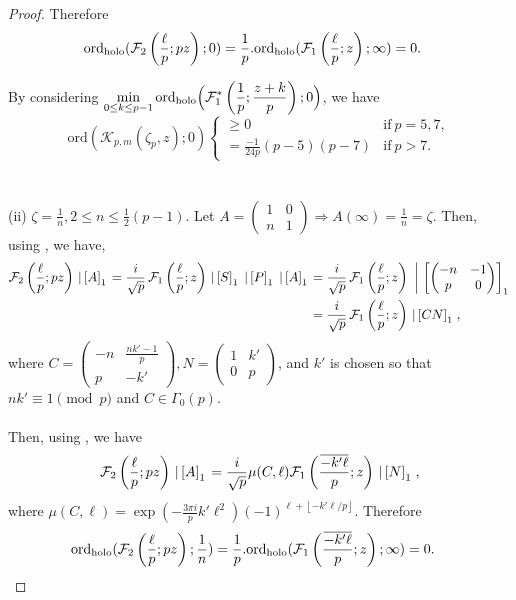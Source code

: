 \documentclass[12pt]{amsart}
\theoremstyle{definition}
\theoremstyle{remark}
\numberwithin{equation}{section}
\newcommand\Fell[4]{\mathcal{F}_{#1}\left(\frac{#2}{#3};#4\right)}
\newcommand\SFell[4]{\mathcal{F}_{#1}^{*}\left(\frac{#2}{#3};#4\right)}
\newcommand\FL[1]{\left\lfloor#1\right\rfloor}
\newcommand\strokeb[2]{\,\left\arrowvert\,\left[#1\right]_#2\right.}
\newcommand\ord{\mbox{ord}}
\newcommand\hord{\mbox{ord}_{\mbox{\scriptsize holo}}}
\begin{document}
\begin{proof}
Therefore
\begin{align*}
\hord(\Fell{2}{\ell}{p}{p z};0)&=\frac{1}{p}.\hord(\Fell{1}{\ell}{p}{z};\infty)=0.
\end{align*}


By considering 
$\displaystyle\min_{0\leq k \leq p-1} \hord\Big(\SFell{1}{1}{p}{\frac{z+k}{p}};0\Big)$, 
we have $$\ord(\mathcal{K}_{p,m}(\zeta_p,z);0) 
\begin{cases}
      \geq 0 & \text{if}\ p=5, 7, \\
      =\frac{-1}{24p}(p-5)(p-7) & \text{if}\ p>7.
\end{cases} $$
\\\\    
(ii) $\zeta=\frac{1}{n},  2 \leq n \leq \frac{1}{2}(p-1)$. Let $A = \begin{pmatrix} 1 & 0 \\ n & 1\end{pmatrix} \Rightarrow A(\infty)=\frac{1}{n}=\zeta$. 
Then, using \cite[Theorem 4.5, p.220]{Ga19a}, we have,
\begin{align*}
\Fell{2}{\ell}{p}{pz} \strokeb{A}{1}
=\frac{i}{\sqrt{p}}\,\Fell{1}{\ell}{p}{z} \strokeb{S}{1} \strokeb{P}{1} \strokeb{A}{1}
&=\frac{i}{\sqrt{p}}\,\Fell{1}{\ell}{p}{z} \strokeb{\begin{pmatrix} -n & -1 \\ p & 0\end{pmatrix}}{1}
\\
&=\frac{i}{\sqrt{p}}\,\Fell{1}{\ell}{p}{z} \strokeb{CN}{1},
\end{align*}
 where
$
C = \begin{pmatrix} -n & \frac{nk'-1}{p} \\ p & -k'\end{pmatrix},
N = \begin{pmatrix} 1 & k' \\ 0 & p\end{pmatrix}$,
and $k'$ is chosen so that $nk'\equiv 1\pmod{p}$ and $C \in \Gamma_0(p)$.
\\\\ 
Then, using \cite[Theorem 4.1, p.218]{Ga19a}, we have 
\begin{align*}
\Fell{2}{\ell}{p}{pz} \strokeb{A}{1}=\frac{i}{\sqrt{p}} \mu(C,\ell)\Fell{1}{\overline{-k' \ell}}{p}{z} \strokeb{N}{1},
\end{align*} 
 where $\mu(C,\ell) = \exp(-\tfrac{3 \pi i}{p}  k' \ell^2) 
(-1)^{\ell + \FL{-k'\ell/p}}$.
Therefore
\begin{align*}
\hord(\Fell{2}{\ell}{p}{p z};\frac{1}{n})&=\frac{1}{p}.\hord(\Fell{1}{\overline{-k' \ell}}{p}{z};\infty)=0.   

\end{align*}
\end{proof}
\end{document}
